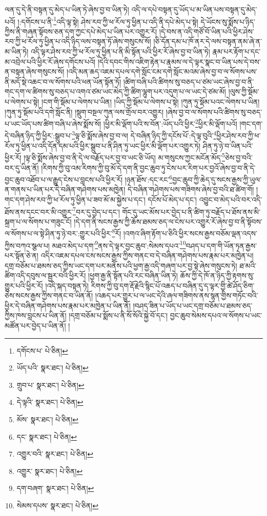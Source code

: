 ལན་དུ་དེ་ནི་བསྟན་དུ་མེད་པ་ཡིན་ཏེ་ཞེས་བྱ་བ་ཡིན་ཏེ། འདི་ལ་དཔེ་བསྟན་དུ་ཡོད་པ་མ་ཡིན་པས་བསྟན་དུ་མེད་པའོ། །:དགོངས་པ་ནི་\footnote{དགོངས་པ་  པེ་ཅིན། }འདི་ལྟ་སྟེ། ཤེས་རབ་ཀྱི་ཕ་རོལ་ཏུ་ཕྱིན་པ་འདི་ནི་དཔེ་མེད་པ་སྟེ། དེ་ཡོངས་སུ་སྨོས་པ་ཉིད་ཀྱིས་ནི་གཞན་སྟོབས་ཅན་དག་ཀྱང་དཔེ་མེད་པ་ཡིན་པར་འགྱུར་རོ། །དེ་བས་ན་འདི་གཙོ་བོ་ཡིན་པའི་ཕྱིར་ཤེས་རབ་ཀྱི་ཕ་རོལ་ཏུ་ཕྱིན་པ་འདི་ཉིད་ལས་བསྟན་ཏོ་ཞེས་གསུངས་སོ། །ཅི་དོན་དམ་པ་ཁོ་ནར་དེ་ལས་བསྟན་ནམ་ཞེ་ན་མ་ཡིན་ཏེ། འདི་ལྟར་ཤེས་རབ་ཀྱི་ཕ་རོལ་ཏུ་ཕྱིན་པ་ནི་མི་སྟོན་པའི་ཕྱིར་རོ་ཞེས་བྱ་བ་ཡིན་ཏེ། རྣམ་པར་རྟོག་པ་དང་མ་འབྲེལ་པའི་ཕྱིར་རོ་ཞེས་དགོངས་པའོ། །དེའི་དབང་གིས་འཇིག་རྟེན་པ་རྣམས་ལ་དེ་ལྟར་སྣང་བ་ཡིན་པས་དེ་བས་ན་བསྟན་ཞེས་གསུངས་སོ། །འདི་མན་ཆད་འཇམ་དཔལ་དགེ་སློང་ངམ་དགེ་སློང་མའམ་ཞེས་བྱ་བ་ལ་སོགས་པས་ནི་མདོ་སྡེ་འཆང་བ་ལ་སོགས་པའི་ཕན་ཡོན་སྟོན་ཏོ། །ཚིག་བཞི་པའི་ཚིགས་སུ་བཅད་པ་ཙམ་ཡང་ཞེས་བྱ་བ་ནི་གང་དག་ལ་ཚིགས་སུ་བཅད་པ་འགའ་ཙམ་ཡང་མེད་ཀྱི་ཚིག་ལྷུག་པར་འདུག་པ་ལ་ཡང་དེ་ཙམ་མོ། །ལུས་ཀྱི་སྡོམ་པ་ལེགས་པ་སྟེ། །ངག་གི་སྡོམ་པ་ལེགས་པ་ཡིན། །ཡིད་ཀྱི་སྡོམ་པ་ལེགས་པ་སྟེ། །ཀུན་ཏུ་སྡོམ་པའང་ལེགས་པ་ཡིན། །ཀུན་ཏུ་སྡོམ་པའི་དགེ་སློང་ནི། །སྡུག་བསྔལ་ཀུན་ལས་གྲོལ་བར་འགྱུར། །ཞེས་བྱ་བ་ལ་སོགས་པའི་ཚིགས་སུ་བཅད་པ་ཡང་ཡོད་པས་ཚིག་བཞི་པ་ཞེས་སྨོས་སོ། །ཕྱིར་མི་ལྡོག་པའི་ས་བོན་:ཡོད་པའི་ཕྱིར་\footnote{ཡོད་པའི་  སྣར་ཐང་།  པེ་ཅིན། }ཕྱིར་མི་ལྡོག་པའོ། །གང་དག་དེ་བཞིན་ཉིད་ཀྱི་ཕྱིར་:སྒྲུབ་པ་\footnote{གྲུབ་པ་  སྣར་ཐང་།  པེ་ཅིན། }ལྟ་ཅི་སྨོས་ཞེས་བྱ་བ་ལ། དེ་བཞིན་ཉིད་ཀྱི་དངོས་པོ་:དེ་ལྟ་བུའི་\footnote{དེ་ལྟའི་  སྣར་ཐང་།  པེ་ཅིན། }ཕྱིར་ཤེས་རབ་ཀྱི་ཕ་རོལ་ཏུ་ཕྱིན་པ་འདི་དོན་དམ་པའི་ཕྱིར་སྒྲུབ་པ་ནི་ཤིན་ཏུ་ཡང་ཕྱིར་མི་ལྡོག་པར་འགྱུར་ཏེ། ཤིན་ཏུ་ཉེ་བ་ཡིན་པའི་ཕྱིར་རོ། །ལྟ་ཅི་སྨོས་ཞེས་བྱ་བ་ནི་དེ་ལ་བརྗོད་པར་བྱ་བ་ཡང་ཅི་ཡོད། མ་གསུངས་ཀྱང་མངོན་མོད་\footnote{མོས་  སྣར་ཐང་།  པེ་ཅིན། }ཅེས་བྱ་བའི་བར་དུ་ཡིན་ནོ། །རིགས་ཀྱི་བུ་འམ་རིགས་ཀྱི་བུ་མོ་དེ་དག་ནི་བྱང་ཆུབ་ཏུ་ངེས་པར་རིག་པར་བྱའོ་ཞེས་བྱ་བ་ནི་དེ་བྱང་ཆུབ་འཐོབ་པ་ལ་རྒྱུད་ངེས་པ་བླངས་པའི་ཕྱིར་རོ། །ཉན་ཐོས་:དང་རང་\footnote{དང་  སྣར་ཐང་།  པེ་ཅིན། }བྱང་ཆུབ་ཀྱི་ཆེད་དུ་སངས་རྒྱས་ཀྱི་ཡུལ་ན་གནས་པ་ཡིན་པར་དེ་བཞིན་གཤེགས་པས་མཁྱེན། དེ་བཞིན་གཤེགས་པས་གཟིགས་ཞེས་བྱ་བའི་ཐ་ཚིག་གོ། །གང་དག་ཤེས་རབ་ཀྱི་ཕ་རོལ་ཏུ་ཕྱིན་པ་ཟབ་མོ་མ་སྐྱེས་པ་དང་། དངོས་པོ་མེད་པ་དང་། འབྱུང་བ་མེད་པའི་བར་འདི་ཐོས་ནས་དངང་བར་མི་འགྱུར་\footnote{འགྱུར་བའི་  སྣར་ཐང་།  པེ་ཅིན། }བར་དུ་བྱེད་པ་དང་། གོང་དུ་ཡང་མོས་པར་བྱེད་པ་ནི་ཚིག་ཏུ་བརྗོད་པ་ཐོས་ནས་མི་སྐྲག་པ་ལ་སོགས་པ་གཟུང་ངོ། །དེ་དག་ནི་སངས་རྒྱས་ཀྱི་ཆོས་ཐམས་ཅད་ལ་ངེས་པར་འགྱུར་རོ་ཞེས་བྱ་བ་ནི་སྟོབས་ལ་སོགས་པ་ལ་སྟེ་ཤིན་ཏུ་ཉེ་བར་:གྱུར་པའི་ཕྱིར་\footnote{འགྱུར་  སྣར་ཐང་།  པེ་ཅིན། }རོ། །འགའ་ཞིག་རྟོག་པ་ཅིའི་ཕྱིར་སངས་རྒྱས་བཅོམ་ལྡན་འདས་ཀྱིས་བཀའ་སྩལ་པ། མཐའ་མེད་པ་དག་\footnote{དག་བཞག་  སྣར་ཐང་།  པེ་ཅིན། }ནས་དེ་ལྟར་བྱང་ཆུབ་:སེམས་དཔའ་\footnote{སེམས་དཔས་  སྣར་ཐང་།  པེ་ཅིན། }བཤད་པ་དག་གི་ཡོན་ཏན་རྒྱས་པར་སྟོན་ཅེ་ན། འདིར་འཇམ་དཔལ་ངས་སངས་རྒྱས་ཀྱིས་གནང་བ་དེ་བཞིན་གཤེགས་པས་རྣམ་པར་མཁྱེན་པ། དགྲ་བཅོམ་པ་ཐམས་ཅད་ཀྱིས་ཡང་དག་པར་མནོས་པའི་ཕྱག་རྒྱ་འདི་གཞག་པར་བྱ་སྟེ་ཞེས་གསུངས་ཏེ། ཐ་མའི་ཚིག་འདི་དབུས་ལ་སྦྱར་བའི་ཕྱིར་རོ། །ཕྱག་རྒྱ་ནི་སྟོན་པའི་རང་བཞིན་ཡིན་ཏེ། ཆོས་ཀྱི་དེ་ཁོ་ན་ཉིད་ཀྱི་རྟགས་སུ་གྱུར་པའི་ཕྱིར་རོ། །འདི་སྐད་བསྟན་ཏེ། རིགས་ཀྱི་བུ་དག་རྡོ་རྗེའི་སྙིང་པོ་འཆད་པ་བཞིན་དུ་ད་ལྟར་གྱི་ཚེ་ཤོད་ཅིག་ཅེས་སངས་རྒྱས་ཀྱིས་གནང་བ་ཡིན་ནོ། །འཆད་པར་གྱུར་པ་ལ་ཡང་དེའི་ཞལ་གཟིགས་ནས་སྙན་གྱིས་གཏོང་བའི་ཕྱིར་དེ་བཞིན་གཤེགས་པས་རྣམ་པར་མཁྱེན་པ་ཡིན་ནོ། །བཤད་ཟིན་པ་ཡོད་པ་ཡང་དགྲ་བཅོམ་པ་ཐམས་ཅད་ཀྱིས་ཁས་བླངས་པ་ཡིན་ནོ། །དགྲ་བཅོམ་པ་སྨོས་པ་ནི་སོ་སོའི་སྐྱེ་བོ་དང་། བྱང་ཆུབ་སེམས་དཔའ་ལ་སོགས་པ་ཡང་མཚོན་པར་བྱེད་པ་ཡིན་ནོ། །
